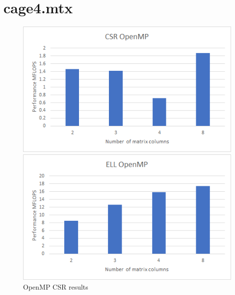 \documentclass{scrreprt}
\begin{document}



\section{cage4.mtx}

\begin{figure}[ht] 
  \label{ fig7} 
  \begin{minipage}[b]{0.5\linewidth}
    \centering
    \includegraphics[width=.9\linewidth]{cage4CSRMP.png} 
    \caption{OpenMP CSR results} 
    \vspace{4ex}
  \end{minipage}%
  \begin{minipage}[b]{0.5\linewidth}
    \centering
    \includegraphics[width=.9\linewidth]{cage4EllMP.png} 

\end{minipage}
\end{figure}
\end{document}
